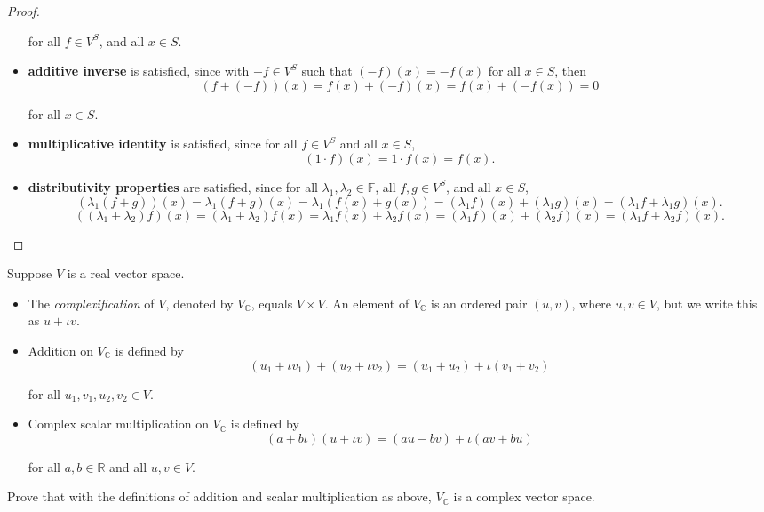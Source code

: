 \begin{proof}
\begin{itemize}
              for all $f\in V^{S}$, and all $x\in S$.
        \item \textbf{additive inverse} is satisfied, since with $-f\in V^{S}$ such that $(-f)(x) = -f(x)$ for all $x\in S$, then
              \[
                  (f + (-f))(x) = f(x) + (-f)(x) = f(x) + (-f(x)) = 0
              \]

              for all $x\in S$.
        \item \textbf{multiplicative identity} is satisfied, since for all $f\in V^{S}$ and all $x\in S$,
              \[
                  (1\cdot f)(x) = 1\cdot f(x) = f(x).
              \]
        \item \textbf{distributivity properties} are satisfied, since for all $\lambda_{1}, \lambda_{2}\in \mathbb{F}$, all $f, g\in V^{S}$, and all $x\in S$,
              \[
                  (\lambda_{1}(f + g))(x) = \lambda_{1}(f + g)(x) = \lambda_{1}(f(x) + g(x)) = (\lambda_{1}f)(x) + (\lambda_{1}g)(x) = (\lambda_{1}f + \lambda_{1}g)(x).
              \]
              \[
                  ((\lambda_{1} + \lambda_{2})f)(x) = (\lambda_{1} + \lambda_{2})f(x) = \lambda_{1}f(x) + \lambda_{2}f(x) = (\lambda_{1}f)(x) + (\lambda_{2}f)(x) = (\lambda_{1}f + \lambda_{2}f)(x).
              \]
    \end{itemize}
\end{proof}

\begin{exercise}
    Suppose $V$ is a real vector space.
    \begin{itemize}
        \item The \textit{complexification} of $V$, denoted by $V_{\mathbb{C}}$, equals $V\times V$. An element of $V_{\mathbb{C}}$ is an ordered pair $(u, v)$, where $u, v\in V$, but we write this as $u + \iota v$.
        \item Addition on $V_{\mathbb{C}}$ is defined by
              \[
                  (u_{1} + \iota v_{1}) + (u_{2} + \iota v_{2}) = (u_{1} + u_{2}) + \iota (v_{1} + v_{2})
              \]

              for all $u_{1}, v_{1}, u_{2}, v_{2}\in V$.
        \item Complex scalar multiplication on $V_{\mathbb{C}}$ is defined by
              \[
                  (a + b\iota) (u + \iota v) = (au - bv) + \iota(av + bu)
              \]

              for all $a, b\in\mathbb{R}$ and all $u, v\in V$.
    \end{itemize}

    Prove that with the definitions of addition and scalar multiplication as above, $V_{\mathbb{C}}$ is a complex vector space.
\end{exercise}

